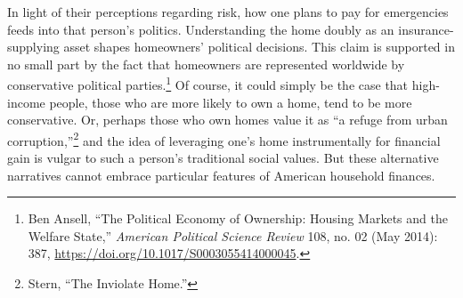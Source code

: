 \documentclass[12pt,oneside]{psthesis}
\begin{document}
In light of their perceptions regarding risk, how one plans to pay for emergencies feeds into that person's politics.
Understanding the home doubly as an insurance-supplying asset shapes homeowners' political decisions.
This claim is supported in no small part by the fact that homeowners are represented worldwide by conservative political parties.\footnote{Ben Ansell, ``The Political Economy of Ownership: Housing Markets and the Welfare State,'' \emph{American Political Science Review} 108, no. 02 (May 2014): 387, \url{https://doi.org/10.1017/S0003055414000045}.}
Of course, it could simply be the case that high-income people, those who are more likely to own a home, tend to be more conservative.
Or, perhaps those who own homes value it as ``a refuge from urban corruption,''\footnote{Stern, ``The Inviolate Home.''} and the idea of leveraging one's home instrumentally for financial gain is vulgar to such a person's traditional social values.
But these alternative narratives cannot embrace particular features of American household finances.
\end{document}
